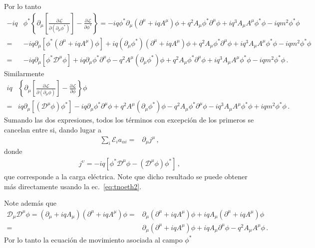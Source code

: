 Por lo tanto
\begin{align}
-iq &\phi^{*} \left\{\partial_{\mu} \left[ \frac{\partial \mathcal{L}}{\partial \left( \partial_{\mu}\phi^{*} \right)} \right]-\frac{\partial \mathcal{L}}{\partial \phi^{*}} \right\}   
= -iq \phi^{*}\partial_{\mu}\left( \partial^{\mu}+iq A^{\mu} \right)\phi+q^2 A_{\mu}  \phi^{*} \partial^{\mu}\phi +iq^3 A_{\mu}A^{\mu}\phi^{*}\phi-iq m^2\phi^{*}\phi \nonumber\\
  =& -iq \partial_{\mu} \left[ \phi^{*}\left( \partial^{\mu}+iq A^{\mu} \right)\phi \right]+iq \left( \partial_{\mu} \phi^{*}\right)\left( \partial^{\mu}+iq A^{\mu} \right)\phi +q^2 A_{\mu}  \phi^{*} \partial^{\mu}\phi +iq^3 A_{\mu}A^{\mu}\phi^{*}\phi-iq m^2\phi^{*}\phi \nonumber\\
  =& -iq \partial_{\mu} \left[ \phi^{*}\mathcal{D}^{\mu}\phi \right]+iq  \partial_{\mu} \phi^{*}\partial^{\mu}\phi-q^2A^\mu \left( \partial_{\mu} \phi^{*} \right)\phi  +q^2 A_{\mu}  \phi^{*} \partial^{\mu}\phi +iq^3 A_{\mu}A^{\mu}\phi^{*}\phi-iq m^2\phi^{*}\phi\,. 
\end{align}
Similarmente
\begin{align}
  iq &\left\{\partial_{\mu} \left[ \frac{\partial \mathcal{L}}{\partial \left( \partial_{\mu}\phi \right)} \right]-\frac{\partial \mathcal{L}}{\partial \phi} \right\} \phi \nonumber\\
  =& iq \partial_{\mu} \left[ \left(  \mathcal{D}^{\mu}\phi \right) \phi^{*} \right]-iq  \partial_{\mu} \phi^{*}\partial^{\mu}\phi+q^2A^\mu \left( \partial_{\mu} \phi^{*} \right)\phi  -q^2 A_{\mu}  \phi^{*} \partial^{\mu}\phi -iq^3 A_{\mu}A^{\mu}\phi^{*}\phi+iq m^2\phi^{*}\phi\,. 
\end{align}
Sumando las dos expresiones, todos los términos con excepción de los primeros se cancelan entre si, dando lugar a 
\begin{align}
   \sum_{i}\mathcal{E}_{i} a_{\alpha i}=& \partial_{\mu} j^{\mu}\,,
\end{align}
donde
\begin{align}
  j^{\upsilon}=-iq \left[  \phi^{*}\mathcal{D}^{\mu}\phi -  \left(  \mathcal{D}^{\mu}\phi \right) \phi^{*}\right]\,,
\end{align}
que corresponde a la carga eléctrica. Note que dicho resultado se puede obtener más directamente usando la ec.~\eqref{eq:tnoeth2}.

Note además que 
\begin{align}
\mathcal{D}_{\mu}\mathcal{D}^{\mu}\phi=  \left( \partial_{\mu}+iq A_{\mu}  \right)\left( \partial^{\mu}+iq A^{\mu} \right)\phi=& \partial_{\mu}\left( \partial^{\mu}+iq A^{\mu} \right)\phi+iq A_{\mu}  \left( \partial^{\mu}+iq A^{\mu} \right)\phi \nonumber\\
=& \partial_{\mu}\left( \partial^{\mu}+iq A^{\mu} \right)\phi+iq A_{\mu}   \partial^{\mu}\phi -q^2 A_{\mu}A^{\mu}\phi\,.
\end{align}
Por lo tanto la ecuación de movimiento asociada al campo $\phi^{*}$




